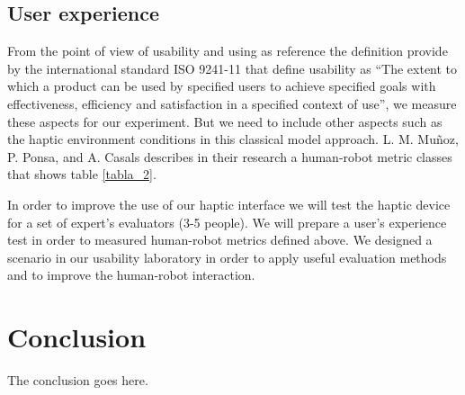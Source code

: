\documentclass[journal,twoside]{JoPhA}
\begin{document}
\subsection{User experience}

From the point of view of usability and using as reference the definition provide by the international standard ISO 9241-11 \cite{ISO98} that define usability as “The extent to which a product can be used by specified users to achieve specified goals with effectiveness, efficiency and satisfaction in a specified context of use”, we measure these aspects for our experiment. But we need to include other aspects such as the haptic environment conditions in this classical model approach. L. M. Muñoz, P. Ponsa, and A. Casals \cite{Munoz12} describes in their research a human-robot metric classes that shows table \ref{tabla_2}.

\begin{table}[h]
\centering
\caption{\label{tabla_2}Human-Robot metric classes}
\end{table}

In order to improve the use of our haptic interface we will test the haptic device for a set of expert's evaluators (3-5 people). We will prepare a user's experience test in order to measured human-robot metrics defined above. We designed a scenario in our usability laboratory in order to apply useful evaluation methods and to improve the human-robot interaction.


\section{Conclusion}

The conclusion goes here.
\end{document}

